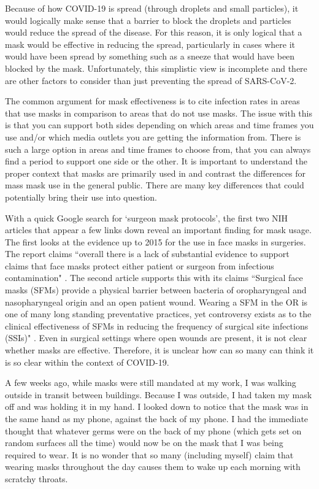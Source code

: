 \documentclass[10pt, a4paper, twocolumn]{book}
\begin{document}
Because of how COVID-19 is spread (through droplets and small particles), it would logically make sense that a barrier to block the droplets and particles would reduce the spread of the disease. For this reason, it is only logical that a mask would be effective in reducing the spread, particularly in cases where it would have been spread by something such as a sneeze that would have been blocked by the mask. Unfortunately, this simplistic view is incomplete and there are other factors to consider than just preventing the spread of SARS-CoV-2.

The common argument for mask effectiveness is to cite infection rates in areas that use masks in comparison to areas that do not use masks. The issue with this is that you can support both sides depending on which areas and time frames you use and/or which media outlets you are getting the information from. There is such a large option in areas and time frames to choose from, that you can always find a period to support one side or the other. It is important to understand the proper context that masks are primarily used in and contrast the differences for mass mask use in the general public. There are many key differences that could potentially bring their use into question. 

With a quick Google search for `surgeon mask protocols', the first two NIH articles that appear a few links down reveal an important finding for mask usage. The first looks at the evidence up to 2015 for the use in face masks in surgeries. The report claims ``overall there is a lack of substantial evidence to support claims that face masks protect either patient or surgeon from infectious contamination" \citep{MasksInSurgury}. The second article supports this with its claims ``Surgical face masks (SFMs) provide a physical barrier between bacteria of oropharyngeal and nasopharyngeal origin and an open patient wound. Wearing a SFM in the OR is one of many long standing preventative practices, yet controversy exists as to the clinical effectiveness of SFMs in reducing the frequency of surgical site infections (SSIs)" \citep{SurgicalMasksInOR}. Even in surgical settings where open wounds are present, it is not clear whether masks are effective. Therefore, it is unclear how can so many can think it is so clear within the context of COVID-19.

A few weeks ago, while masks were still mandated at my work, I was walking outside in transit between buildings. Because I was outside, I had taken my mask off and was holding it in my hand. I looked down to notice that the mask was in the same hand as my phone, against the back of my phone. I had the immediate thought that whatever germs were on the back of my phone (which gets set on random surfaces all the time) would now be on the mask that I was being required to wear. It is no wonder that so many (including myself) claim that wearing masks throughout the day causes them to wake up each morning with scratchy throats.
\end{document}

